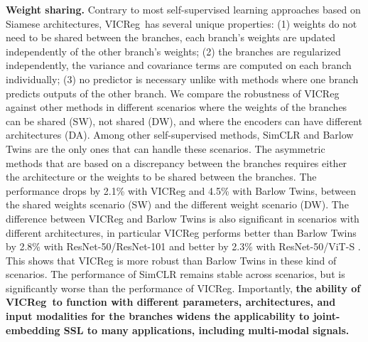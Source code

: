 \documentclass{article} %
\newcommand{\algo}{VICReg}
\begin{document}

\textbf{Weight sharing.} \label{sec:non-shared} 
Contrary to most self-supervised learning approaches based on Siamese architectures, \algo \ has several unique properties: (1) weights do not need to be shared between the branches, each branch's weights are updated independently of the other branch's weights; (2) the branches are regularized independently, the variance and covariance terms are computed on each branch individually; (3) no predictor is necessary unlike with methods where one branch predicts outputs of the other branch. We compare the robustness of VICReg against other methods in different scenarios where the weights of the branches can be shared (SW), not shared (DW), and where the encoders can have different  architectures (DA). Among other self-supervised methods, SimCLR and Barlow Twins are the only ones that can handle these scenarios. The asymmetric methods that are based on a discrepancy between the branches requires either the architecture or the weights to be shared between the branches. The performance drops by 2.1\% with VICReg and 4.5\% with Barlow Twins, between the shared weights scenario (SW) and the different weight scenario (DW). The difference between VICReg and Barlow Twins is also significant in scenarios with different architectures, in particular VICReg performs better than Barlow Twins by 2.8\% with ResNet-50/ResNet-101 and better by 2.3\% with ResNet-50/ViT-S \cite{dosovitskiy2021vit}. This shows that VICReg is more robust than Barlow Twins in these kind of scenarios. The performance of SimCLR remains stable across scenarios, but is significantly worse than the performance of VICReg. Importantly, {\bf the ability of \algo \ to function with different parameters, architectures, and input modalities for the branches widens the applicability to joint-embedding SSL to many applications, including multi-modal signals.}

\end{document}
